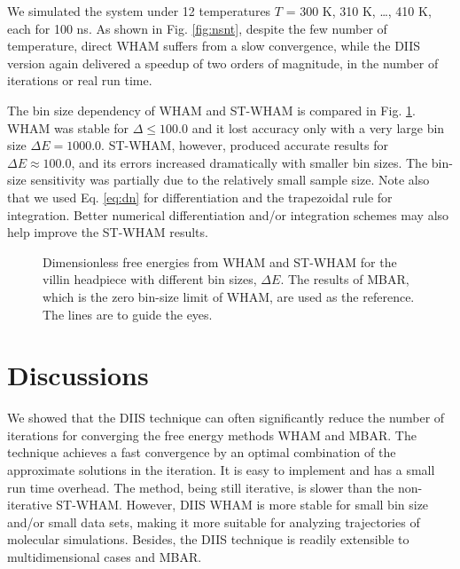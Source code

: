 \documentclass[reprint,superscriptaddress]{revtex4-1}
\begin{document}
We simulated the system under 12 temperatures
$T$ = 300 K, 310 K, \dots, 410 K,
each for {\color{red} 100} ns.
%
As shown in Fig. \ref{fig:nsnt},
despite the few number of temperature,
direct WHAM suffers from a slow convergence,
while the DIIS version again
delivered a speedup of two orders of magnitude,
in the number of iterations or real run time.



The bin size dependency of WHAM and ST-WHAM
is compared in Fig. \ref{fig:whamcmp}.
%
WHAM was stable for $\Delta \le 100.0$
and it lost accuracy
only with a very large bin size $\Delta E = 1000.0$.
%
ST-WHAM, however,
produced accurate results for $\Delta E \approx 100.0$,
and its errors increased dramatically
with smaller bin sizes.
%
The bin-size sensitivity was partially due to
the relatively small sample size.
%
Note also that
we used Eq. \eqref{eq:dn} for differentiation
and the trapezoidal rule for integration.
%
Better numerical differentiation\cite{press}
and/or integration schemes\cite{
kim2011} may also help improve the ST-WHAM results.



\begin{figure}[h]
  \caption{
    \label{fig:whamcmp}
    Dimensionless free energies
    from WHAM and ST-WHAM
    for the villin headpiece
    with different bin sizes, $\Delta E$.
    The results of MBAR, which is
    the zero bin-size limit of WHAM,
    are used as the reference.
    The lines are to guide the eyes.
  }
\end{figure}




%
%





\section{Discussions}



We showed that the DIIS technique
can often significantly reduce
the number of iterations
for converging the free energy methods
WHAM and MBAR.
%
The technique achieves a fast convergence
by an optimal combination of the approximate
solutions in the iteration.
%
It is easy to implement
and has a small run time overhead.
%
The method,
being still iterative,
is slower than
the non-iterative ST-WHAM.
%
However, DIIS WHAM
is more stable for small bin size
and/or small data sets,
making it more suitable
for analyzing trajectories
of molecular simulations.
%
Besides, the DIIS technique
is readily extensible to
multidimensional cases
and MBAR.
\end{document}
